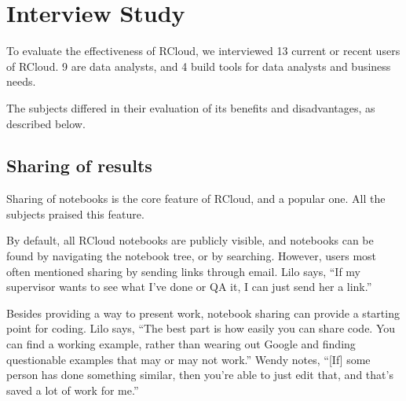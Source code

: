 \section{Interview Study\label{sec:interviews}}

To evaluate the effectiveness of RCloud, we interviewed 13 current or
recent users of RCloud. 9 are data analysts, and 4 build tools for data
analysts and business needs.

The subjects differed in their evaluation of its benefits and disadvantages,
as described below.


\subsection{Sharing of results}
Sharing of notebooks is the core feature of RCloud, and a popular one. All
the subjects praised this feature.


By default, all RCloud notebooks are publicly visible, and notebooks can be
found by navigating the notebook tree, or by searching. However, users most
often mentioned sharing by sending links through email. Lilo says,
``If my supervisor wants to see what I've done or QA it, I can just send her a link.''

Besides providing a way to present work, notebook sharing can provide a
starting point for coding. Lilo says, ``The best part is how easily you can
share code. You can find a working example, rather than wearing
out Google and finding questionable examples that may or may not work.'' Wendy
notes, ``[If] some person has done something similar, then you're able to just
edit that, and that's saved a lot of work for me.''

